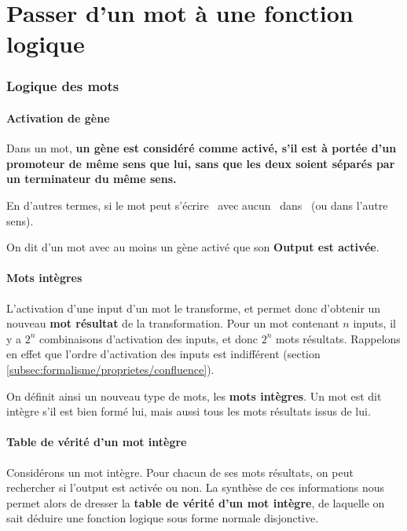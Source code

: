 \part{Passer d'un mot à une fonction logique}
\label{mot_to_logic}

\section{Logique des mots}
\label{sec:mot_to_logic/logique}

\subsection{Activation de gène}
\label{subsec:mot_to_logic/logique/activation}
\par
Dans un mot, \textbf{un gène est considéré comme activé, s'il est à portée d'un promoteur de même sens que lui, sans que les deux soient séparés par un terminateur du même sens.}
\par
En d'autres termes, si le mot peut s'écrire \ANY \PF \NOTANY \GF \ANY ~avec aucun \TF ~dans \NOTANY ~(ou dans l'autre sens).
\par
On dit d'un mot avec au moins un gène activé que son \textbf{Output est activée}.\\

\subsection{Mots intègres}
\label{subsec:mot_to_logic/logique/integres}
\par
L'activation d'une input d'un mot le transforme, et permet donc d'obtenir un nouveau \textbf{mot résultat} de la transformation. Pour un mot contenant $n$ inputs, il y a $2^n$ combinaisons d'activation des inputs, et donc $2^n$ mots résultats. Rappelons en effet que l'ordre d'activation des inputs est indifférent (section \ref{subsec:formalisme/proprietes/confluence}).
\par
On définit ainsi un nouveau type de mots, les \textbf{mots intègres}. Un mot est dit intègre s'il est bien formé lui, mais aussi tous les mots résultats issus de lui.\\

\subsection{Table de vérité d'un mot intègre}
\label{subsec:mot_to_logic/logique/veritas}
\par
Considérons un mot intègre. Pour chacun de ses mots résultats, on peut rechercher si l'output est activée ou non. La synthèse de ces informations nous permet alors de dresser la \textbf{table de vérité d'un mot intègre}, de laquelle on sait déduire une fonction logique sous forme normale disjonctive.

